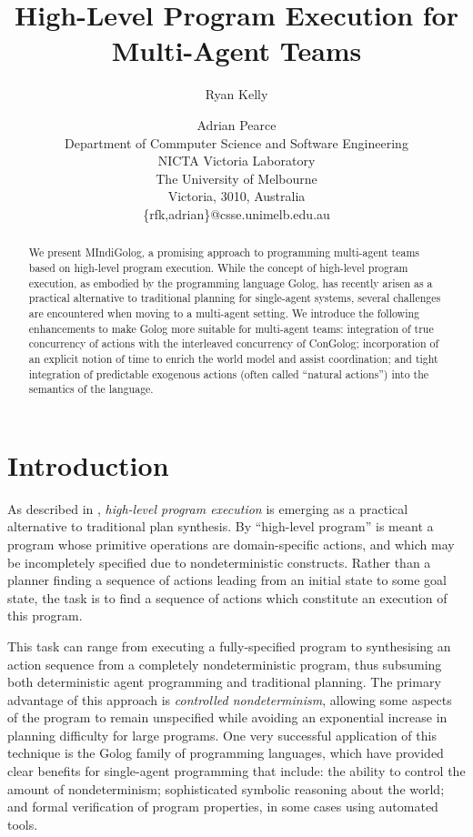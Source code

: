 \documentclass[letterpaper]{article}
\title{High-Level Program Execution for Multi-Agent Teams}
\author{Ryan Kelly \and Adrian Pearce \\
Department of Commputer Science and Software Engineering \\
NICTA Victoria Laboratory \\
The University of Melbourne \\
Victoria, 3010, Australia \\
\{rfk,adrian\}@csse.unimelb.edu.au}
\begin{document}
\maketitle

\begin{abstract}
We present MIndiGolog, a promising approach to programming multi-agent teams
based on high-level program execution. While the concept of high-level program
execution, as embodied by the programming language Golog, has recently arisen
as a practical
alternative to traditional planning for single-agent systems, several
challenges are encountered when moving to a multi-agent setting.  We introduce
the following enhancements to make Golog more suitable for multi-agent teams:
integration of true concurrency of actions with the interleaved concurrency
of ConGolog; incorporation of an explicit notion of time to enrich the world
model and assist coordination; and tight integration of predictable
exogenous actions (often called ``natural actions'') into the semantics of
the language.
\end{abstract}

\section{Introduction}

As described in \cite{giacomo99indigolog}, \emph{high-level program execution}
is emerging as a practical alternative to traditional plan
synthesis. By ``high-level program'' is meant a program whose
primitive operations are domain-specific actions, and which may be
incompletely specified due to nondeterministic constructs. Rather
than a planner finding a sequence of actions leading from an initial
state to some goal state, the task is to
find a sequence of actions which constitute an execution of this program.

This task can range from executing a fully-specified program to synthesising
an action sequence from a completely nondeterministic program, thus
subsuming both deterministic agent programming and traditional planning.
The primary advantage of this approach is \emph{controlled nondeterminism},
allowing some aspects of the program to remain unspecified while avoiding
an exponential increase in planning difficulty for large programs.
One very successful application of this technique is the Golog \cite{levesque97golog}
family of programming languages, which have provided clear benefits
for single-agent programming that include: the ability to control
the amount of nondeterminism; sophisticated symbolic reasoning about
the world; and formal verification of program properties, in some
cases using automated tools.
\end{document}
